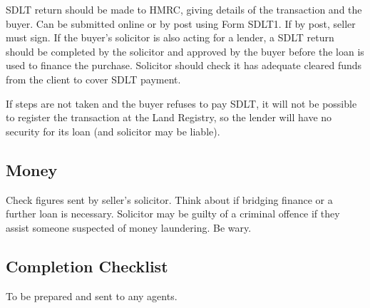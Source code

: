 \documentclass[
]{article}
\begin{document}
SDLT return should be made to HMRC, giving details of the transaction
and the buyer. Can be submitted online or by post using Form SDLT1. If
by post, seller must sign. If the buyer's solicitor is also acting for a
lender, a SDLT return should be completed by the solicitor and approved
by the buyer before the loan is used to finance the purchase. Solicitor
should check it has adequate cleared funds from the client to cover SDLT
payment.

If steps are not taken and the buyer refuses to pay SDLT, it will not be
possible to register the transaction at the Land Registry, so the lender
will have no security for its loan (and solicitor may be liable).

\hypertarget{money}{%
\subsection{Money}\label{money}}

Check figures sent by seller's solicitor. Think about if bridging
finance or a further loan is necessary. Solicitor may be guilty of a
criminal offence if they assist someone suspected of money laundering.
Be wary.

\hypertarget{completion-checklist}{%
\subsection{Completion Checklist}\label{completion-checklist}}

To be prepared and sent to any agents.
\end{document}
